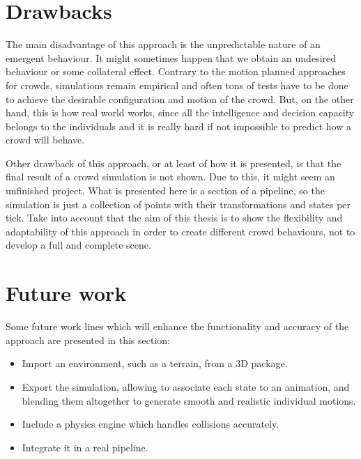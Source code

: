 \section{Drawbacks}

The main disadvantage of this approach is the unpredictable nature of an emergent behaviour. It might sometimes happen that we obtain an undesired behaviour or some collateral effect. Contrary to the motion planned approaches for crowds, simulations remain empirical and often tons of tests have to be done to achieve the desirable configuration and motion of the crowd. But, on the other hand, this is how real world works, since all the intelligence and decision capacity belongs to the individuals and it is really hard if not impossible to predict how a crowd will behave.

Other drawback of this approach, or at least of how it is presented, is that the final result of a crowd simulation is not shown. Due to this, it might seem an unfinished project. What is presented here is a section of a pipeline, so the simulation is just a collection of points with their transformations and states per tick. Take into account that the aim of this thesis is to show the flexibility and adaptability of this approach in order to create different crowd behaviours, not to develop a full and complete scene.

\newpage
\section{Future work}

Some future work lines which will enhance the functionality and accuracy of the approach are presented in this section:

\begin{itemize}
\item Import an environment, such as a terrain, from a 3D package.
\item Export the simulation, allowing to associate each state to an animation, and blending them altogether to generate smooth and realistic individual motions.
\item Include a physics engine which handles collisions accurately.
\item Integrate it in a real pipeline.
\end{itemize}


\ifx\isEmbedded\undefined


\pagebreak

\fi